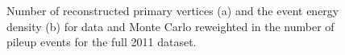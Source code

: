 \begin{figure}[hbt]
\begin{center}
\caption{\label{fig:PUValidation_Full2011} Number of reconstructed primary vertices (a) and
the event energy density (b) for data and Monte Carlo reweighted in the number 
of pileup events for the full 2011 dataset.}
\end{center}
\end{figure}

